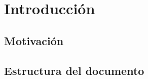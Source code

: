 \chapter{Introducción \label{sec:introduccion}}

\section{Motivaci\'on \label{sec:motivacion}}

 
\section{Estructura del documento \label{sec:estructura}}
